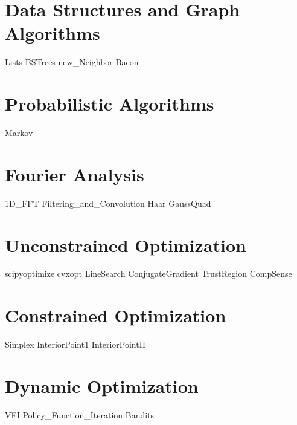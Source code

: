 \documentclass[nociteref]{SIAM-GH-book}
\begin{document}
\part{Data Structures and Graph Algorithms}
{Lists}
{BSTrees}
{new_Neighbor}
{Bacon}
\part{Probabilistic Algorithms}
{Markov}
\part{Fourier Analysis}
{1D_FFT}
{Filtering_and_Convolution}
{Haar}
{GaussQuad}


\part{Unconstrained Optimization}
{scipyoptimize}
{cvxopt}
{LineSearch}
{ConjugateGradient}
{TrustRegion}
{CompSense}
\part{Constrained Optimization}
{Simplex}
{InteriorPoint1}
{InteriorPointII}
\part{Dynamic Optimization}
{VFI}
{Policy_Function_Iteration}
{Bandits}
\end{document}
